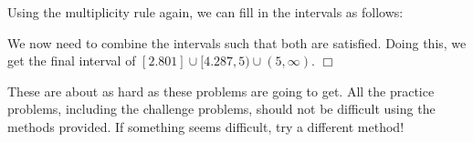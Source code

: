 \documentclass[lang=en,11pt]{elegantbook}
\begin{document}
\begin{solution}
\noindent Using the multiplicity rule again, we can fill in the intervals as follows:

\begin{figure}[!h]
    \centering
\end{figure}

\noindent We now need to combine the intervals such that both are satisfied.  Doing this, we get the final interval of $[2.801]\cup[4.287,5)\cup(5,\infty).$ $\Box$
\end{solution}
These are about as hard as these problems are going to get.  All the practice problems, including the challenge problems, should not be difficult using the methods provided.  If something seems difficult, try a different method!
\end{document}
